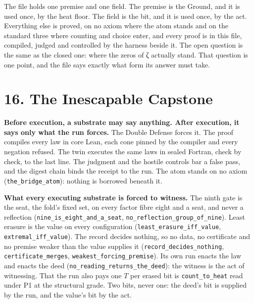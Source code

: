 \documentclass[10pt,twocolumn]{article}
\begin{document}
The file holds one premise and one field. The premise is the Ground, and
it is used once, by the heat floor. The field is the bit, and it is used
once, by the act. Everything else is proved, on no axiom where the atom
stands and on the standard three where counting and choice enter, and
every proof is in this file, compiled, judged and controlled by the
harness beside it. The open question is the same as the closed one:
where the zeros of ζ actually stand. That question is one point, and the
file says exactly what form its answer must take.

\hypertarget{the-inescapable-capstone}{%
\section{16. The Inescapable Capstone}\label{the-inescapable-capstone}}

\textbf{Before execution, a substrate may say anything. After execution,
it says only what the run forces.} The Double Defense forces it. The
proof compiles every law in core Lean, each cone pinned by the compiler
and every negation refused. The twin executes the same laws in sealed
Fortran, check by check, to the last line. The judgment and the hostile
controls bar a false pass, and the digest chain binds the receipt to the
run. The atom stands on no axiom (\texttt{the\_\allowbreak{}bridge\_\allowbreak{}atom}): nothing
is borrowed beneath it.

\textbf{What every executing substrate is forced to witness.} The ninth
gate is the seat, the fold's fixed set, on every factor fibre eight and
a seat, and never a reflection (\texttt{nine\_\allowbreak{}is\_\allowbreak{}eight\_\allowbreak{}and\_\allowbreak{}a\_\allowbreak{}seat},
\texttt{no\_\allowbreak{}reflection\_\allowbreak{}group\_\allowbreak{}of\_\allowbreak{}nine}). Least erasure is the value on
every configuration (\texttt{least\_\allowbreak{}erasure\_\allowbreak{}iff\_\allowbreak{}value},
\texttt{extremal\_\allowbreak{}iff\_\allowbreak{}value}). The record decides nothing, so no data,
no certificate and no premise weaker than the value supplies it
(\texttt{record\_\allowbreak{}decides\_\allowbreak{}nothing}, \texttt{certificate\_\allowbreak{}merges},
\texttt{weakest\_\allowbreak{}forcing\_\allowbreak{}premise}). Its own run enacts the law and
enacts the deed (\texttt{no\_\allowbreak{}reading\_\allowbreak{}returns\_\allowbreak{}the\_\allowbreak{}deed}): the witness
is the act of witnessing. That the run also pays one \(T\) per erased
bit is \texttt{count\_\allowbreak{}to\_\allowbreak{}heat} read under P1 at the structural grade.
Two bits, never one: the deed's bit is supplied by the run, and the
value's bit by the act.
\end{document}

